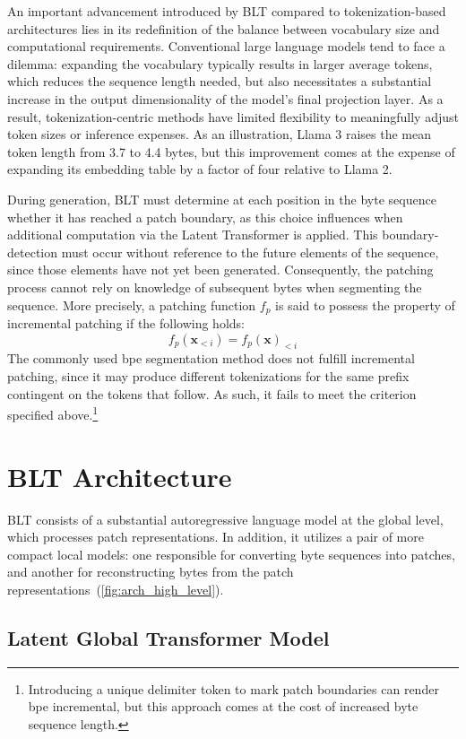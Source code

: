 An important advancement introduced by {\textsc BLT} compared to tokenization-based architectures lies in its redefinition of the balance between vocabulary size and computational requirements. Conventional large language models tend to face a dilemma: expanding the vocabulary typically results in larger average tokens, which reduces the sequence length needed, but also necessitates a substantial increase in the output dimensionality of the model’s final projection layer. As a result, tokenization-centric methods have limited flexibility to meaningfully adjust token sizes or inference expenses. As an illustration, Llama 3 raises the mean token length from 3.7 to 4.4 bytes, but this improvement comes at the expense of expanding its embedding table by a factor of four relative to Llama 2.

During generation, {\textsc BLT} must determine at each position in the byte sequence whether it has reached a patch boundary, as this choice influences when additional computation via the Latent Transformer is applied. This boundary-detection must occur without reference to the future elements of the sequence, since those elements have not yet been generated. Consequently, the patching process cannot rely on knowledge of subsequent bytes when segmenting the sequence. More precisely, a patching function $f_p$ is said to possess the property of incremental patching if the following holds:
$$f_p(\pmb{x}_{<i}) = f_p(\pmb{x})_{<i}$$
The commonly used bpe segmentation method does not fulfill incremental patching, since it may produce different tokenizations for the same prefix contingent on the tokens that follow. As such, it fails to meet the criterion specified above.\footnote{Introducing a unique delimiter token to mark patch boundaries can render bpe incremental, but this approach comes at the cost of increased byte sequence length.}

\section{{\textsc BLT} Architecture}
\label{section:architecture}
{\textsc BLT} consists of a substantial autoregressive language model at the global level, which processes patch representations. In addition, it utilizes a pair of more compact local models: one responsible for converting byte sequences into patches, and another for reconstructing bytes from the patch representations~(\autoref{fig:arch_high_level}).

\subsection{Latent Global Transformer Model}

